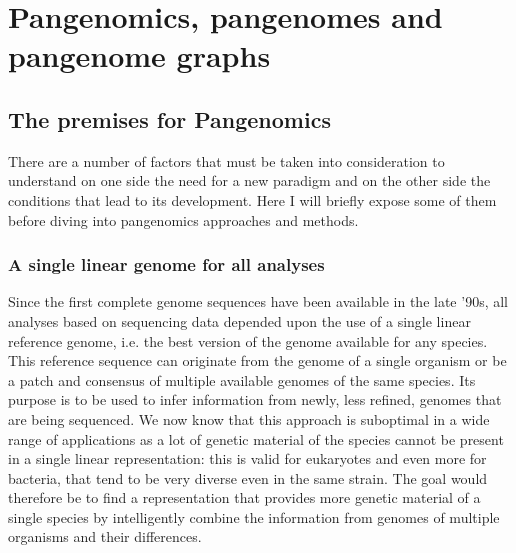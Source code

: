 \section{Pangenomics, pangenomes and pangenome graphs}

\subsection{The premises for Pangenomics}
There are a number of factors that must be taken into consideration to understand on one side the need for a new paradigm and on the other side the conditions that lead to its development. Here I will briefly expose some of them before diving into pangenomics approaches and methods. 

\subsubsection{A single linear genome for all analyses}
Since the first complete genome sequences have been available in the late '90s, all analyses based on sequencing data depended upon the use of a single linear reference genome, i.e. the best version of the genome available for any species. This reference sequence can originate from the genome of a single organism or be a patch and consensus of multiple available genomes of the same species. Its purpose is to be used to infer information from newly, less refined, genomes that are being sequenced. We now know that this approach is suboptimal in a wide range of applications as a lot of genetic material of the species cannot be present in a single linear representation: this is valid for eukaryotes and even more for bacteria, that tend to be very diverse even in the same strain. The goal would therefore be to find a representation that provides more genetic material of a single species by intelligently combine the information from genomes of multiple organisms and their differences.

